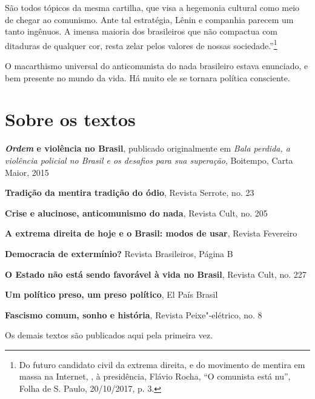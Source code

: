 São todos tópicos da mesma cartilha, que visa a hegemonia cultural como
meio de chegar ao comunismo. Ante tal estratégia, Lênin e companhia
parecem um tanto ingênuos. A imensa maioria dos brasileiros que não
compactua com ditaduras de qualquer cor, resta zelar pelos valores de
nossas sociedade.''\footnote{Do futuro candidato civil da extrema
  direita, e do movimento de mentira em massa na Internet, , à
  presidência, Flávio Rocha, ``O comunista está nu'', Folha de S. Paulo,
  20/10/2017, p. 3.}

O macarthismo universal do anticomunista do nada brasileiro estava
enunciado, e bem presente no mundo da vida. Há muito ele se tornara
política consciente.

\chapter{Sobre os textos}

\textbf{\emph{Ordem} e violência no Brasil}, publicado originalmente em
\emph{Bala perdida, a violência policial no Brasil e os desafios para
sua superação}, Boitempo, Carta Maior, 2015

\textbf{Tradição da mentira tradição do ódio}, Revista Serrote, no. 23

\textbf{Crise e alucinose, anticomunismo do nada}, Revista Cult, no. 205

\textbf{A extrema direita de hoje e o Brasil: modos de usar}, Revista
Fevereiro

\textbf{Democracia de extermínio?} Revista Brasileiros, Página B

\textbf{O Estado não está sendo favorável à vida no Brasil}, Revista
Cult, no. 227

\textbf{Um político preso, um preso político}, El País Brasil

\textbf{Fascismo comum, sonho e história}, Revista Peixe"-elétrico, no. 8

Os demais textos são publicados aqui pela primeira vez.
